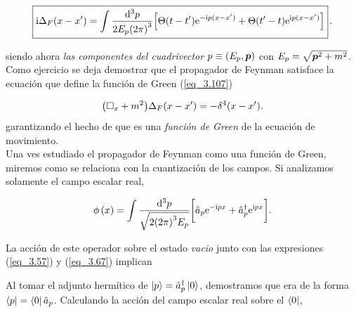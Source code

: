 \begin{equation}
    \boxed{\mathrm{i} \Delta_F \qty(x-x^\prime)  = \int \frac{\dd[3]{p}}{2E_p \qty(2\pi)^3} \qty[ \Theta(t-t^{\prime}) \mathrm{e}^{-\mathrm{i} p(x-x^{\prime})} + \Theta(t^{\prime}-t) \mathrm{e}^{\mathrm{i} p(x-x^{\prime})} ] } \, .
    \label{eq_3.137}
\end{equation}

siendo ahora \emph{las componentes del cuadrivector} $p \equiv (E_p,\vb*{p})$ con $E_p=\sqrt{\vb*{p}^2+m^2}$.\\

Como ejercicio se deja demostrar que el propagador de Feynman satisface la ecuación que define la función de Green (\ref{eq_3.107})

\begin{equation}
    \qty(\square_x + m^2)\Delta_F(x-x^\prime)=-\delta^4 (x-x^\prime). 
\end{equation}
garantizando el hecho de que es una \emph{función de Green} de la ecuación de movimiento.\\

Una ves estudiado el propagador de Feynman como una función de Green, miremos como se relaciona con la cuantización de los campos. Si analizamos solamente el campo escalar real, 

\begin{equation*}
    \phi \left(x\right) =  \int \frac{\dd[3]{p}}{\sqrt{2\qty(2\pi)^{3}E_p}} \qty\bigg[\hat{a}_p \mathrm{e}^{-\mathrm{i} px} + \hat{a}^{\dag}_p\mathrm{e}^{\mathrm{i} px}].
\end{equation*}

La acción de este operador sobre el estado \emph{vacio} junto con las expresiones (\ref{eq_3.57}) y (\ref{eq_3.67}) implican


Al tomar el adjunto hermítico de $\ket{p} = \hat{a}^\dag_p \ket{0}$, demostramos que era de la forma $\bra{p}=\bra{0}\hat{a}_p$. Calculando la acción del campo escalar real sobre el $\bra{0}$,


